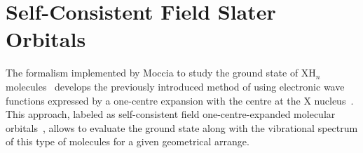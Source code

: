 


\section{Self-Consistent Field Slater Orbitals}
\label{ch:scf_sto}


The formalism implemented by Moccia to study the ground state of
XH$_{n}$ molecules~\cite{Moccia_JCP_2164,Moccia_JCP_2176,Moccia_1964}
develops the previously introduced method of using electronic wave
functions expressed by a one-centre expansion with the centre at the X
nucleus~\cite{Parr_JCP_1960,oneCentre_1961}. This approach, labeled as
self-consistent field one-centre-expanded molecular
orbitals~\cite{Moccia_JCP_2164}, allows to evaluate the ground state
along with the vibrational spectrum of this type of molecules for a
given geometrical arrange.

